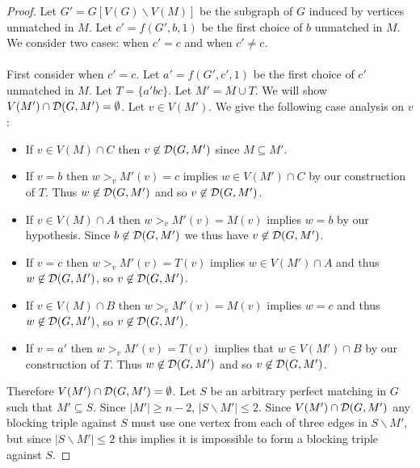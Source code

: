 \begin{proof}
Let $G' = G[V(G)\backslash V(M)]$ be the subgraph of $G$ induced by vertices unmatched in $M$. Let $c' = f(G',b,1)$ be the first choice of $b$ unmatched in $M$. We consider two cases: when $c' = c$ and when $c' \neq c$.

\paragraph{} First consider when $c' = c$.  Let $a' = f(G',c', 1)$ be the first choice of $c'$ unmatched in $M$. Let $T = \{a'bc\}$. Let $M' = M \cup T$. We will show $V(M') \cap \mathcal{D}(G,M') =\emptyset$. Let $v \in V(M')$. We give the following case analysis on $v$:
\begin{itemize} 
\item If $v \in V(M) \cap C$ then $v \not\in \mathcal{D}(G,M')$ since $M \subseteq M'$.
\item If $v = b$ then $w >_v M'(v) = c$ implies $w \in V(M') \cap C$ by our construction of $T$. Thus $w \not\in \mathcal{D}(G,M')$ and so $v \not\in \mathcal{D}(G,M')$.
\item If $v \in V(M) \cap A$ then $w >_v M'(v) = M(v)$ implies $w = b$ by our hypothesis. Since $b \not\in \mathcal{D}(G,M')$ we thus have $v \not\in \mathcal{D}(G,M')$. 
\item If $v = c$ then $w>_v M'(v) = T(v)$ implies $w \in V(M') \cap A$ and thus $w \not\in \mathcal{D}(G,M')$, so $v\not\in \mathcal{D}(G,M')$.
\item If $v \in V(M) \cap B$ then $w>_v M'(v)=M(v)$ implies $w = c$ and thus $w \not\in \mathcal{D}(G,M')$, so $v \not\in \mathcal{D}(G,M')$.
\item If $v = a'$ then $w >_v M'(v) = T(v)$ implies that $w \in V(M') \cap B$ by our construction of $T$. Thus $w\not\in \mathcal{D}(G,M')$ and so $v\not\in \mathcal{D}(G,M')$. 
\end{itemize}
Therefore $V(M') \cap \mathcal{D}(G,M') = \emptyset$. Let $S$ be an arbitrary perfect matching in $G$ such that $M' \subseteq S$. Since $|M'| \geq n-2$, $|S\backslash M'| \leq 2$. Since $V(M') \cap \mathcal{D}(G,M')$ any blocking triple against $S$ must use one vertex from each of three edges in $S\backslash M'$, but since $|S\backslash M'| \leq 2$ this implies it is impossible to form a blocking triple against $S$.

\end{proof}
